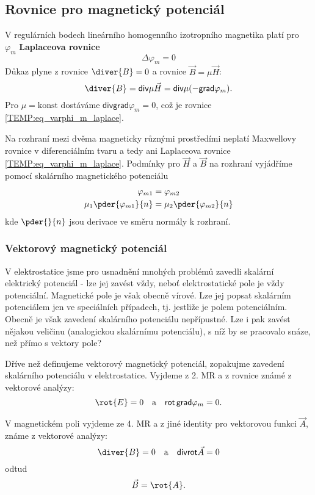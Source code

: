     \subsection{Rovnice pro magnetický potenciál}
      V regulárních bodech lineárního homogenního izotropního magnetika platí pro $\varphi_m$
      \textbf{Laplaceova rovnice}
      \begin{equation}\label{TEMP:eq_varphi_m_laplace}
        \Delta\varphi_m = 0
      \end{equation}      
      Důkaz plyne z rovnice $\diver{B} = 0$ a rovnice $\vec{B} = \mu\vec{H}$: $$\diver{B} =
      \textsf{div}\mu\vec{H} = \textsf{div}\mu(-\textsf{grad}\varphi_m).$$ Pro $\mu = \text{konst}$
      dostáváme $\textsf{div}\textsf{grad}\varphi_m = 0$, což je rovnice
      \ref{TEMP:eq_varphi_m_laplace}.
      
      Na rozhraní mezi dvěma magneticky různými prostředími neplatí Maxwellovy rovnice v
      diferenciálním tvaru a tedy ani Laplaceova rovnice \ref{TEMP:eq_varphi_m_laplace}. Podmínky 
      pro $\vec{H}$ a $\vec{B}$ na rozhraní vyjádříme pomocí skalárního magnetického potenciálu
       \begin{align}\label{TEMP:eq_mag_U_rozhrani}
         \varphi_{m1}                 &= \varphi_{m2} \\
         \mu_1\pder{\varphi_{m1}}{n}  &= \mu_2\pder{\varphi_{m2}}{n} 
       \end{align}
      kde $\pder{}{n}$ jsou derivace ve směru normály k rozhraní. 
    
    \subsubsection{Vektorový magnetický potenciál}
      V elektrostatice jsme pro usnadnění mnohých problémů zavedli skalární elektrický potenciál -
      lze jej zavést vždy, neboť elektrostatické pole je vždy potenciální. Magnetické pole je však
      obecně vírové. Lze jej popsat skalárním potenciálem jen ve speciálních případech, tj.
      jestliže je polem potenciálním. Obecně je však zavedení skalárního potenciálu nepřípustné.
      Lze i pak zavést nějakou veličinu (analogickou skalárnímu potenciálu), s níž by se pracovalo
      snáze, než přímo s vektory pole?
      
      Dříve než definujeme vektorový magnetický potenciál, zopakujme zavedení skalárního potenciálu
      v elektrostatice. Vyjdeme z 2. MR a z rovnice známé z vektorové analýzy: $$\rot{E} = 0 \quad
      \text{a} \quad \textsf{rot}\,\textsf{grad}\varphi_m = 0.$$
      
      V magnetickém poli vyjdeme ze 4. MR a z jiné identity pro vektorovou funkci $\vec{A}$, známe z
      vektorové analýzy: $$\diver{B} = 0 \quad \text{a} \quad \textsf{div}\textsf{rot}\vec{A} =
      0$$ odtud
        \begin{equation}\label{TEMP:eq_B_rotA}
          \vec{B} = \rot{A}.
        \end{equation}       
               

